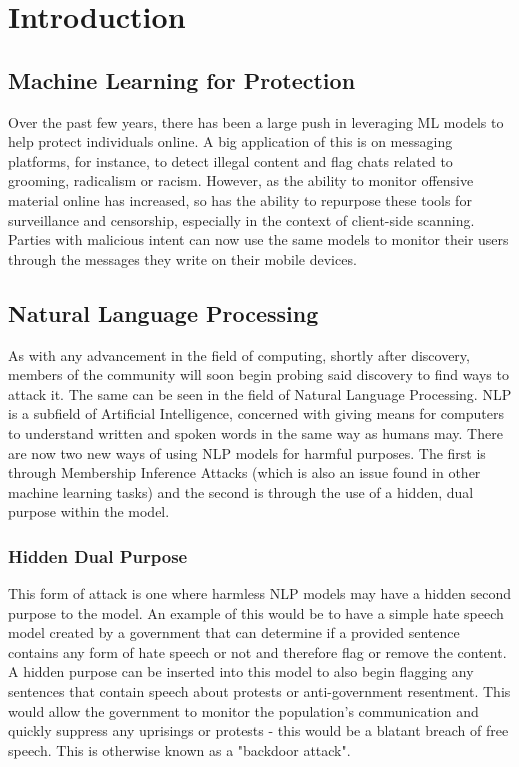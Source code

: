 \chapter{Introduction}

\section{Machine Learning for Protection}

Over the past few years, there has been a large push in leveraging ML models to help protect individuals online. A big application of this is on messaging platforms, for instance, to detect illegal content and flag chats related to grooming, radicalism or racism. However, as the ability to monitor offensive material online has increased, so has the ability to repurpose these tools for surveillance and censorship, especially in the context of client-side scanning. Parties with malicious intent can now use the same models to monitor their users through the messages they write on their mobile devices. 

\section{Natural Language Processing}

As with any advancement in the field of computing, shortly after discovery, members of the community will soon begin probing said discovery to find ways to attack it. The same can be seen in the field of Natural Language Processing. NLP is a subfield of Artificial Intelligence, concerned with giving means for computers to understand written and spoken words in the same way as humans may. There are now two new ways of using NLP models for harmful purposes. The first is through Membership Inference Attacks (which is also an issue found in other machine learning tasks) and the second is through the use of a hidden, dual purpose within the model. 

\subsection{Hidden Dual Purpose}

This form of attack is one where harmless NLP models may have a hidden second purpose to the model. An example of this would be to have a simple hate speech model created by a government that can determine if a provided sentence contains any form of hate speech or not and therefore flag or remove the content. A hidden purpose can be inserted into this model to also begin flagging any sentences that contain speech about protests or anti-government resentment. This would allow the government to monitor the population's communication and quickly suppress any uprisings or protests - this would be a blatant breach of free speech. This is otherwise known as a "backdoor attack".

